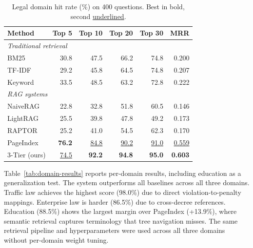 \documentclass{IOS-Book-Article}
\begin{document}
\begin{table}[H]
\centering\footnotesize
\caption{Legal domain hit rate (\%) on 400 questions. Best in bold, second \underline{underlined}.}
\label{tab:main-results}
\begin{tabular}{l@{\hskip 3pt}r@{\hskip 3pt}r@{\hskip 3pt}r@{\hskip 3pt}r@{\hskip 3pt}r}
\toprule
\textbf{Method} & \textbf{Top 5} & \textbf{Top 10} & \textbf{Top 20} & \textbf{Top 30} & \textbf{MRR} \\
\midrule
\multicolumn{6}{l}{\textit{Traditional retrieval}} \\
BM25 & 30.8 & 47.5 & 66.2 & 74.8 & 0.200 \\
TF-IDF & 29.2 & 45.8 & 64.5 & 74.8 & 0.207 \\
Keyword & 33.5 & 48.5 & 63.2 & 72.8 & 0.222 \\
\midrule
\multicolumn{6}{l}{\textit{RAG systems}} \\
NaiveRAG \cite{r2} & 22.8 & 32.8 & 51.8 & 60.5 & 0.146 \\
LightRAG \cite{r5} & 25.5 & 39.8 & 47.8 & 49.2 & 0.173 \\
RAPTOR \cite{r29} & 25.2 & 41.0 & 54.5 & 62.3 & 0.170 \\
PageIndex \cite{r7} & \textbf{76.2} & \underline{84.8} & \underline{90.2} & \underline{91.0} & \underline{0.559} \\
\midrule
3-Tier (ours) & \underline{74.5} & \textbf{92.2} & \textbf{94.8} & \textbf{95.0} & \textbf{0.603} \\
\bottomrule
\end{tabular}
\end{table}

Table~\ref{tab:domain-results} reports per-domain results, including education as a generalization test. The system outperforms all baselines across all three domains. Traffic law achieves the highest score (98.0\%) due to direct violation-to-penalty mappings. Enterprise law is harder (86.5\%) due to cross-decree references. Education (88.5\%) shows the largest margin over PageIndex (+13.9\%), where semantic retrieval captures terminology that tree navigation misses. The same retrieval pipeline and hyperparameters were used across all three domains without per-domain weight tuning.
\end{document}
